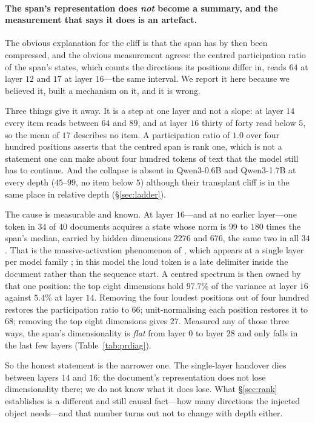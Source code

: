 \documentclass{article}
\begin{document}
\paragraph{The span's representation does \emph{not} become a summary, and the
measurement that says it does is an artefact.} The obvious explanation for the
cliff is that the span has by then been compressed, and the obvious measurement
agrees: the centred participation ratio of the span's states, which counts the
directions its positions differ in, reads $64$ at layer $12$ and $17$ at layer
$16$---the same interval. We report it here because we believed it, built a
mechanism on it, and it is wrong.

Three things give it away. It is a step at one layer and not a slope: at layer
$14$ every item reads between $64$ and $89$, and at layer $16$ thirty of forty
read below $5$, so the mean of $17$ describes no item. A participation ratio of
$1.0$ over four hundred positions asserts that the centred span is rank one,
which is not a statement one can make about four hundred tokens of text that
the model still has to continue. And the collapse is absent in Qwen3-0.6B and
Qwen3-1.7B at every depth ($45$--$99$, no item below $5$) although their
transplant cliff is in the same place in relative depth
(\S\ref{sec:ladder}).

The cause is measurable and known. At layer $16$---and at no earlier layer---one
token in $34$ of $40$ documents acquires a state whose norm is $99$ to $180$ times the
span's median, carried by hidden dimensions $2276$ and $676$, the same two in
all $34$. That is the massive-activation phenomenon of
\citet{sun2024massive}, which appears at a single layer per model family
\citep{shi2026melayer}; in this model the loud token is a late delimiter inside
the document rather than the sequence start. A centred spectrum is then owned by
that one position: the top eight dimensions hold $97.7\%$ of the variance at
layer $16$ against $5.4\%$ at layer $14$. Removing the four loudest positions
out of four hundred restores the participation ratio to $66$; unit-normalising
each position restores it to $68$; removing the top eight dimensions gives $27$.
Measured any of those three ways, the span's dimensionality is
\emph{flat} from layer $0$ to layer $28$ and only falls in the last few layers
(Table~\ref{tab:prdiag}).

So the honest statement is the narrower one. The single-layer handover dies
between layers $14$ and $16$; the document's representation does not lose
dimensionality there; we do not know what it does lose. What \S\ref{sec:rank}
establishes is a different and still causal fact---how many directions the
injected object needs---and that number turns out not to change with depth
either.
\end{document}
